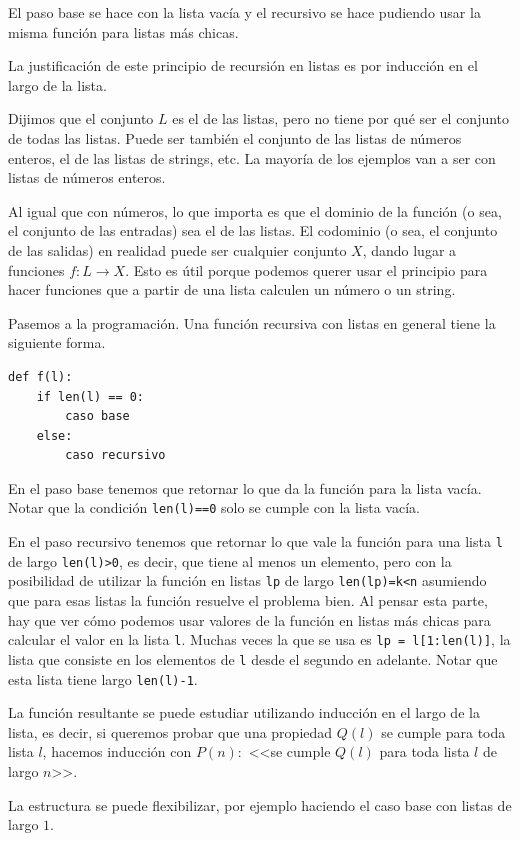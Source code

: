\documentclass[a4paper, 12pt]{report}
\theoremstyle{definition}
\begin{document}
El paso base se hace con la lista vacía y el recursivo se hace pudiendo usar la misma función para listas más chicas.

La justificación de este principio de recursión en listas es por inducción en el largo de la lista.

Dijimos que el conjunto $L$ es el de las listas, pero no tiene por qué ser el conjunto de todas las listas. Puede ser también el conjunto de las listas de números enteros, el de las listas de strings, etc. La mayoría de los ejemplos van a ser con listas de números enteros.

Al igual que con números, lo que importa es que el dominio de la función (o sea, el conjunto de las entradas) sea el de las listas. El codominio (o sea, el conjunto de las salidas) en realidad puede ser cualquier conjunto $X$, dando lugar a funciones $f:L\to X$. Esto es útil porque podemos querer usar el principio para hacer funciones que a partir de una lista calculen un número o un string.

Pasemos a la programación. Una función recursiva con listas en general tiene la siguiente forma.

\begin{verbatim}
def f(l):
    if len(l) == 0:
        caso base
    else:
        caso recursivo
\end{verbatim}

En el paso base tenemos que retornar lo que da la función para la lista vacía. Notar que la condición {\tt len(l)==0} solo se cumple con la lista vacía.

En el paso recursivo tenemos que retornar lo que vale la función para una lista {\tt l} de largo {\tt len(l)>0}, es decir, que tiene al menos un elemento, pero con la posibilidad de utilizar la función en listas {\tt lp} de largo {\tt len(lp)=k<n} asumiendo que para esas listas la función resuelve el problema bien. Al pensar esta parte, hay que ver cómo podemos usar valores de la función en listas más chicas para calcular el valor en la lista {\tt l}. Muchas veces la que se usa es {\tt lp = l[1:len(l)]}, la lista que consiste en los elementos de {\tt l} desde el segundo en adelante. Notar que esta lista tiene largo {\tt len(l)-1}.

La función resultante se puede estudiar utilizando inducción en el largo de la lista, es decir, si queremos probar que una propiedad $Q(l)$ se cumple para toda lista $l$, hacemos inducción con $P(n):$ <<se cumple $Q(l)$ para toda lista $l$ de largo $n$>>.

La estructura se puede flexibilizar, por ejemplo haciendo el caso base con listas de largo $1$.
\end{document}
